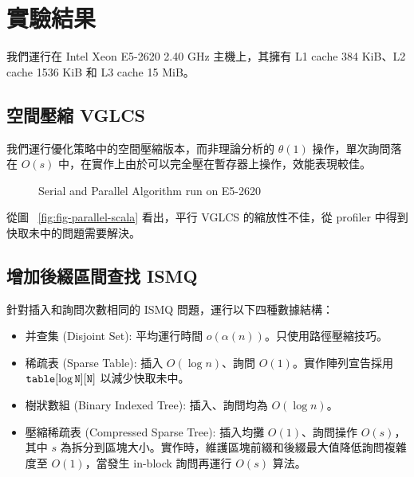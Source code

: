 \documentclass{gapd}
\begin{document}
\section{實驗結果}
\label{sec:Experiment}

我們運行在 Intel Xeon E5-2620 2.40 GHz 主機上，其擁有 L1 cache 384 KiB、L2 cache 1536 KiB 和 L3 cache 15 MiB。

\subsection{空間壓縮 VGLCS}

我們運行優化策略中的空間壓縮版本，而非理論分析的 $\theta(1)$ 操作，單次詢問落在 $O(s)$ 中，在實作上由於可以完全壓在暫存器上操作，效能表現較佳。

\begin{figure*}[!thb]
  \centering
  \subfigure[Runtime]{
    
    \label{fig:fig-parallel}
  }
  \subfigure[Scalability]{
    
    \label{fig:fig-parallel-scala}
  }
  \caption{Serial and Parallel Algorithm run on E5-2620}
\end{figure*}

從圖 ~\ref{fig:fig-parallel-scala} 看出，平行 VGLCS 的縮放性不佳，從 profiler 中得到快取未中的問題需要解決。



\subsection{增加後綴區間查找 ISMQ}

針對插入和詢問次數相同的 ISMQ 問題，運行以下四種數據結構：

\begin{itemize}
  \item 并查集 (Disjoint Set): 平均運行時間 $o(\alpha(n))$。只使用路徑壓縮技巧。
  \item 稀疏表 (Sparse Table): 插入 $O(\log n)$、詢問 $O(1)$。實作陣列宣告採用 $\tt{table}[\log N][N]$ 以減少快取未中。
  \item 樹狀數組 (Binary Indexed Tree): 插入、詢問均為 $O(\log n)$。
  \item 壓縮稀疏表 (Compressed Sparse Tree): 插入均攤 $O(1)$、詢問操作 $O(s)$，其中 $s$ 為拆分到區塊大小。實作時，維護區塊前綴和後綴最大值降低詢問複雜度至 $O(1)$，當發生 in-block 詢問再運行 $O(s)$ 算法。
\end{itemize}
\end{document}
